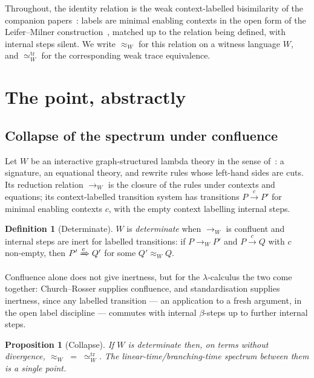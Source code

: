 \documentclass[11pt]{article}
\theoremstyle{plain}
\newtheorem{proposition}[theorem]{Proposition}
\theoremstyle{definition}
\newtheorem{definition}[theorem]{Definition}
\theoremstyle{remark}
\newcommand{\bisW}[1]{\approx_{#1}}
\newcommand{\treq}[1]{\simeq^{\mathrm{tr}}_{#1}}
\begin{document}
Throughout, the identity relation is the weak context-labelled bisimilarity of
the companion papers~\cite{BIHOL,NoWNS,Extension}: labels are minimal enabling
contexts in the open form of the Leifer--Milner
construction~\cite{LeiferMilner00}, matched up to the relation being defined,
with internal steps silent. We write $\bisW{W}$ for this relation on a witness
language $W$, and $\treq{W}$ for the corresponding weak trace equivalence.

\section{The point, abstractly}\label{sec:abstract}

\subsection{Collapse of the spectrum under confluence}

Let $W$ be an interactive graph-structured lambda theory in the sense
of~\cite{Omnibus,Extension}: a signature, an equational theory, and rewrite
rules whose left-hand sides are cuts. Its reduction relation $\to_W$ is the
closure of the rules under contexts and equations; its context-labelled
transition system has transitions $P \xrightarrow{c} P'$ for minimal enabling
contexts $c$, with the empty context labelling internal steps.

\begin{definition}[Determinate]
$W$ is \emph{determinate} when $\to_W$ is confluent and internal steps are
inert for labelled transitions: if $P \to_W P'$ and $P \xrightarrow{c} Q$
with $c$ non-empty, then $P' \xRightarrow{c} Q'$ for some $Q' \bisW{W} Q$.
\end{definition}

Confluence alone does not give inertness, but for the $\lambda$-calculus the
two come together: Church--Rosser supplies confluence, and standardisation
supplies inertness, since any labelled transition --- an application to a
fresh argument, in the open label discipline --- commutes with internal
$\beta$-steps up to further internal steps.

\begin{proposition}[Collapse]\label{prop:collapse}
If $W$ is determinate then, on terms without divergence,
$\bisW{W} \;=\; \treq{W}$. The linear-time/branching-time spectrum between
them is a single point.
\end{proposition}
\end{document}
